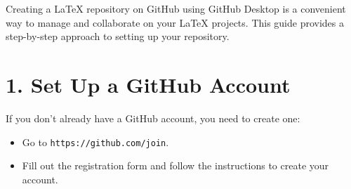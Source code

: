 \documentclass[12pt, a4paper]{article}
\begin{document}
\textmd{Creating a LaTeX repository on GitHub using GitHub Desktop is a convenient way to manage and collaborate on your LaTeX projects. This guide provides a step-by-step approach to setting up your repository.}

\vspace{1.3cm}

\section*{\textcolor{blue!60}{1. Set Up a GitHub Account}}

\textmd{If you don’t already have a GitHub account, you need to create one:}
\begin{itemize}
    \item Go to \texttt{https://github.com/join}.
    \item Fill out the registration form and follow the instructions to create your account.
\end{itemize}

\vspace{1cm}
\end{document}

